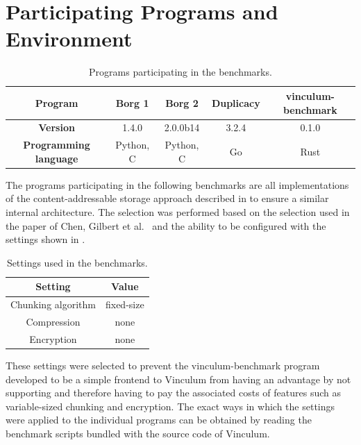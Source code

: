 \section{Participating Programs and Environment}

\begin{table}
    \centering
    \begin{tabular}{ c c c c c }
        \toprule
        \textbf{Program} & Borg 1 & Borg 2 & Duplicacy & vinculum-benchmark \\
        \midrule
        \textbf{Version} & 1.4.0  & 2.0.0b14 & 3.2.4 & 0.1.0 \\
        \midrule
        \textbf{Programming language} & Python, C & Python, C & Go & Rust \\
        \bottomrule
    \end{tabular}
    \caption{Programs participating in the benchmarks.}\label{tab:benchmark-programs}
\end{table}

The programs participating in the following benchmarks are all implementations
of the content-addressable storage approach described in 
to ensure a similar internal architecture.
The selection was performed based on the selection used in the paper of Chen, Gilbert
et al.~\cite{Duplicacy} and the ability to be configured with the settings shown in
.

\begin{table}
    \centering
    \begin{tabular}{ c c }
        \toprule
        \textbf{Setting} & \textbf{Value} \\
        \midrule
        Chunking algorithm & fixed-size \\
        \midrule
        Compression & none \\
        \midrule
        Encryption & none \\
        \bottomrule
    \end{tabular}
    \caption{Settings used in the benchmarks.}\label{tab:benchmark-settings}
\end{table}

These settings were selected to prevent the vinculum-benchmark program developed
to be a simple frontend to Vinculum from having an advantage by not supporting
and therefore having to pay the associated costs of features such as variable-sized
chunking and encryption.
The exact ways in which the settings were applied to the individual programs can be
obtained by reading the benchmark scripts bundled with the source code of Vinculum.

